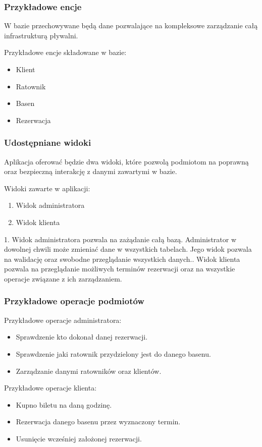 \documentclass{article}
\begin{document}
\subsubsection{Przykładowe encje}
W bazie przechowywane będą dane pozwalające na kompleksowe zarządzanie całą infrastrukturą pływalni.
\vspace{1mm}

Przykładowe encje składowane w bazie:
 \begin{itemize}
    \item Klient
    \item Ratownik
    \item Basen
    \item Rezerwacja
\end{itemize}

\subsubsection{Udostępniane widoki}
Aplikacja oferować będzie dwa widoki, które pozwolą podmiotom na poprawną oraz bezpieczną interakcję z danymi zawartymi w bazie.
\vspace{1mm}

Widoki zawarte w aplikacji:
\begin{enumerate}
    \item Widok administratora
    \item Widok klienta
\end{enumerate}
1. Widok administratora pozwala na zażądanie całą bazą. Administrator w dowolnej chwili może zmieniać dane w wszystkich tabelach. Jego widok pozwala na walidację oraz swobodne przeglądanie wszystkich danych.. Widok klienta pozwala na przeglądanie możliwych terminów rezerwacji oraz na wszystkie operacje związane z ich zarządzaniem.

\subsubsection{Przykładowe operacje podmiotów}
Przykładowe operacje administratora:
\begin{itemize}
    \item Sprawdzenie kto dokonał danej rezerwacji.
    \item Sprawdzenie jaki ratownik przydzielony jest do danego basenu.
    \item Zarządzanie danymi ratowników oraz klientów.
\end{itemize}
Przykładowe operacje klienta:
\begin{itemize}
    \item Kupno biletu na daną godzinę.
    \item Rezerwacja danego basenu przez wyznaczony termin.
    \item Usunięcie wcześniej założonej rezerwacji.
\end{itemize}
\end{document}
